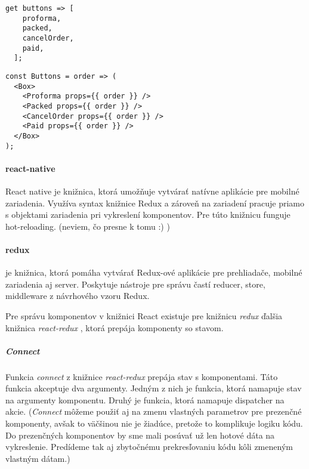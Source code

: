 \begin{lstlisting}[caption=Pole komponentov v Dart-e]
  get buttons => [
    proforma,
    packed,
    cancelOrder,
    paid,
  ];
\end{lstlisting}

\begin{lstlisting}[caption=Pole komponentov v JavaScripte s použitím knižnice React]
const Buttons = order => (
  <Box>
    <Proforma props={{ order }} />
    <Packed props={{ order }} />
    <CancelOrder props={{ order }} />
    <Paid props={{ order }} />
  </Box>
);
\end{lstlisting}

\paragraph{react-native}
\NEW{}
React native \cite{ReactNative} je knižnica, ktorá umožňuje vytvárať natívne aplikácie pre mobilné zariadenia. Využíva syntax knižnice Redux a zároveň na zariadení pracuje priamo s objektami zariadenia pri vykreslení komponentov. Pre túto knižnicu funguje hot-reloading.
\TODO{} (neviem, čo presne k tomu :) )

\paragraph{redux}
\NEW{}\NEW{}
\cite[Redux]{redux-lib} je knižnica, ktorá pomáha vytvárať Redux-ové aplikácie pre prehliadače, mobilné zariadenia aj server. Poskytuje nástroje pre správu častí reducer, store, middleware z návrhového vzoru Redux. 

Pre správu komponentov v knižnici React existuje pre knižnicu \emph{redux} ďalšia knižnica \emph{react-redux} \cite{react-redux}, ktorá prepája komponenty so stavom.

\subparagraph{Connect}
\label{func:connect}
Funkcia \emph{connect} z knižnice \emph{react-redux} \cite{react-redux} prepája stav s komponentami. Táto funkcia akceptuje dva argumenty. Jedným z nich je funkcia, ktorá namapuje stav na argumenty komponentu. Druhý je funkcia, ktorá namapuje dispatcher na akcie. %
(\emph{Connect} môžeme použiť aj na zmenu vlastných parametrov pre prezenčné komponenty, avšak to väčšinou nie je žiadúce, pretože to komplikuje logiku kódu. Do prezenčných komponentov by sme mali posúvať už len hotové dáta na vykreslenie. Predídeme tak aj zbytočnému prekresľovaniu kódu kôli zmeneným vlastným dátam.)



